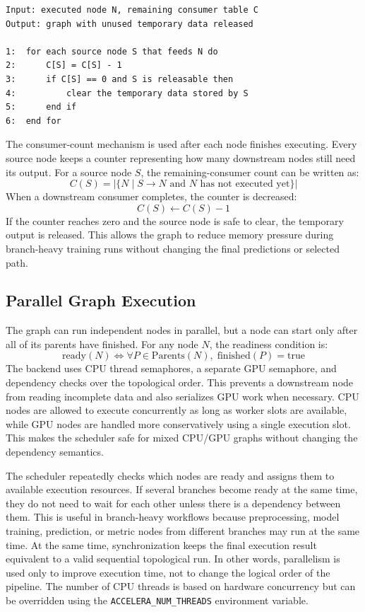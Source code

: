 \begin{lstlisting}[style=algostyle,caption={Consumer-count based intermediate release},label={alg:consumer-release}]
Input: executed node N, remaining consumer table C
Output: graph with unused temporary data released

1:  for each source node S that feeds N do
2:      C[S] = C[S] - 1
3:      if C[S] == 0 and S is releasable then
4:          clear the temporary data stored by S
5:      end if
6:  end for
\end{lstlisting}

The consumer-count mechanism is used after each node finishes executing. Every
source node keeps a counter representing how many downstream nodes still need
its output. For a source node \(S\), the remaining-consumer count can be written as:
\[
C(S) = |\{N \mid S \rightarrow N \text{ and } N \text{ has not executed yet}\}|
\]
When a downstream consumer completes, the counter is decreased:
\[
C(S) \leftarrow C(S) - 1
\]
If the counter reaches zero and the source node is safe to clear, the temporary output
is released. This allows the graph to reduce memory pressure during branch-heavy
training runs without changing the final predictions or selected path.

\subsection{Parallel Graph Execution}
The graph can run independent nodes in parallel, but a node can start only after
all of its parents have finished. For any node \(N\), the readiness condition is:
\[
\text{ready}(N) \Longleftrightarrow \forall P \in \text{Parents}(N),\; \text{finished}(P)=\text{true}
\]
The backend uses CPU thread semaphores, a separate GPU semaphore, and
dependency checks over the topological order. This prevents a downstream node
from reading incomplete data and also serializes GPU work when necessary. CPU
nodes are allowed to execute concurrently as long as worker slots are available,
while GPU nodes are handled more conservatively using a single execution slot.
This makes the scheduler safe for mixed CPU/GPU graphs without changing the
dependency semantics.

The scheduler repeatedly checks which nodes are ready and assigns them to
available execution resources. If several branches become ready at the same
time, they do not need to wait for each other unless there is a dependency
between them. This is useful in branch-heavy workflows because preprocessing,
model training, prediction, or metric nodes from different branches may run at
the same time. At the same time, synchronization keeps the final execution result
equivalent to a valid sequential topological run. In other words, parallelism is
used only to improve execution time, not to change the logical order of the
pipeline. The number of CPU threads is based on hardware concurrency but can be
overridden using the \texttt{ACCELERA\_NUM\_THREADS} environment variable.

